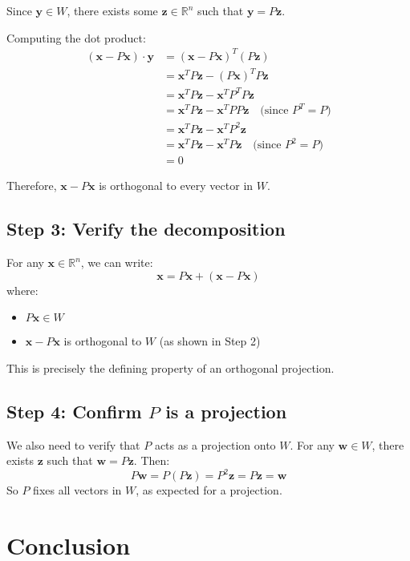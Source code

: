 \documentclass{article}
\begin{document}
Since $\mathbf{y} \in W$, there exists some $\mathbf{z} \in \mathbb{R}^n$ such that $\mathbf{y} = P\mathbf{z}$.

Computing the dot product:
\begin{align*}
(\mathbf{x} - P\mathbf{x}) \cdot \mathbf{y} 
&= (\mathbf{x} - P\mathbf{x})^T (P\mathbf{z}) \\
&= \mathbf{x}^T P\mathbf{z} - (P\mathbf{x})^T P\mathbf{z} \\
&= \mathbf{x}^T P\mathbf{z} - \mathbf{x}^T P^T P\mathbf{z} \\
&= \mathbf{x}^T P\mathbf{z} - \mathbf{x}^T P P\mathbf{z} \quad \text{(since $P^T = P$)} \\
&= \mathbf{x}^T P\mathbf{z} - \mathbf{x}^T P^2\mathbf{z} \\
&= \mathbf{x}^T P\mathbf{z} - \mathbf{x}^T P\mathbf{z} \quad \text{(since $P^2 = P$)} \\
&= 0
\end{align*}

Therefore, $\mathbf{x} - P\mathbf{x}$ is orthogonal to every vector in $W$.

\subsection*{Step 3: Verify the decomposition}

For any $\mathbf{x} \in \mathbb{R}^n$, we can write:
\[
\mathbf{x} = P\mathbf{x} + (\mathbf{x} - P\mathbf{x})
\]
where:
\begin{itemize}
\item $P\mathbf{x} \in W$
    \item $\mathbf{x} - P\mathbf{x}$ is orthogonal to $W$ (as shown in Step 2)
\end{itemize}

This is precisely the defining property of an orthogonal projection.

\subsection*{Step 4: Confirm $P$ is a projection}

We also need to verify that $P$ acts as a projection onto $W$. For any $\mathbf{w} \in W$, there exists $\mathbf{z}$ such that $\mathbf{w} = P\mathbf{z}$. Then:
\[
P\mathbf{w} = P(P\mathbf{z}) = P^2\mathbf{z} = P\mathbf{z} = \mathbf{w}
\]
So $P$ fixes all vectors in $W$, as expected for a projection.

\section*{Conclusion}
\end{document}
